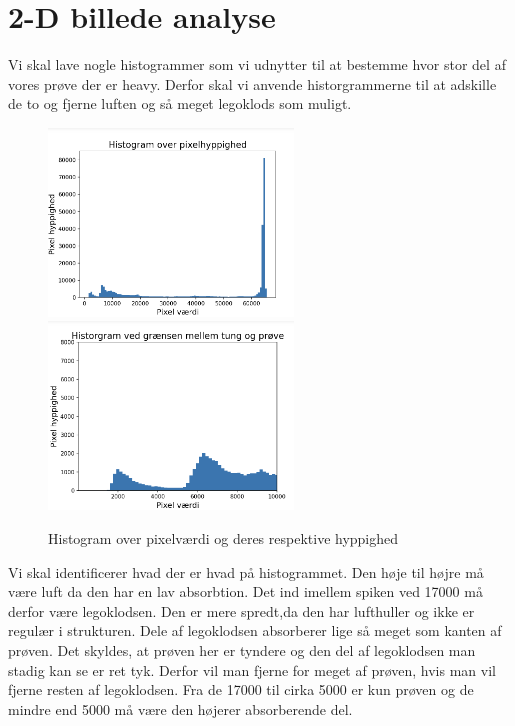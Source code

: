 \documentclass[a4paper,twoside]{article}
\begin{document}
\section{2-D billede analyse}
Vi skal lave nogle histogrammer som vi udnytter til at bestemme hvor stor del af vores prøve der er heavy. Derfor skal vi anvende historgrammerne til at adskille de to og fjerne luften og så meget legoklods som muligt. 
\begin{figure}[H]
\begin{centering}
\includegraphics[height=5cm]{Histogram2d.PNG}
\includegraphics[height=5cm]{2dhistogram0til10000.png}
\hspace{1cm}
\par\end{centering}
\caption{\label{cap:2ien} Histogram over pixelværdi og deres respektive hyppighed}
\end{figure}
Vi skal identificerer hvad der er hvad på histogrammet. Den høje til højre må være luft da den har en lav absorbtion. Det ind imellem spiken ved 17000 må derfor være legoklodsen. Den er mere spredt,da den har lufthuller og ikke er regulær i strukturen. Dele af legoklodsen absorberer lige så meget som kanten af prøven. Det skyldes, at prøven her er tyndere og den del af legoklodsen man stadig kan se er ret tyk. Derfor vil man fjerne for meget af prøven, hvis man vil fjerne resten af legoklodsen. Fra de 17000 til cirka 5000 er kun prøven og de mindre end 5000 må være den højerer absorberende del.  
\end{document}
